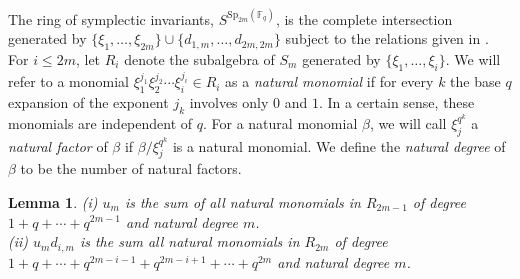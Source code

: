 \documentclass{amsart}
\newtheorem{lemma}[subsection]{Lemma}
\newcommand{\field}{\mathbb{F}}
\newcommand{\syp}[2]{{{\text{Sp}_{{#1}}(\field_{#2})}}}
\begin{document}
The ring of symplectic invariants, $S^{\syp{2m}{q}}$, is the complete intersection
generated by $\{\xi_1,\ldots, \xi_{2m}\}\cup\{d_{1,m},\ldots,d_{2m,2m}\}$
subject to the relations given in 
\cite[Theorem 8.3.11]{benson-polyinvafinigrou:93}.
For $i\leq 2m$, let $R_i$ denote the subalgebra of $S_m$ generated by 
$\{\xi_1,\ldots, \xi_i\}$. We will refer to a monomial $\xi_1^{j_1}\xi_2^{j_2}\cdots\xi_i^{j_i} \in R_i$
as a {\it natural monomial} if for every $k$ 
the base $q$ expansion of the exponent $j_k$ involves only $0$ and $1$. In a certain sense, these monomials are independent of $q$.
For a natural monomial $\beta$, we will call $\xi_j^{q^k}$ a {\it natural factor} of  $\beta$ if $\beta/\xi_j^{q^k}$ is a natural monomial.
We define the {\it natural degree} of $\beta$ to be the number of natural factors.



\begin{lemma} \label{nat_mon_lem} (i) $u_m$ is the sum of all natural monomials in $R_{2m-1}$ of degree $1+q+\cdots +q^{2m-1}$ and natural degree $m$.\\
(ii) $u_md_{i,m}$ is the sum all natural monomials in $R_{2m}$ of degree $1+q+\cdots +q^{2m-i-1}+q^{2m-i+1}+\cdots +q^{2m}$ and natural degree $m$.
\end{lemma}
\end{document}
